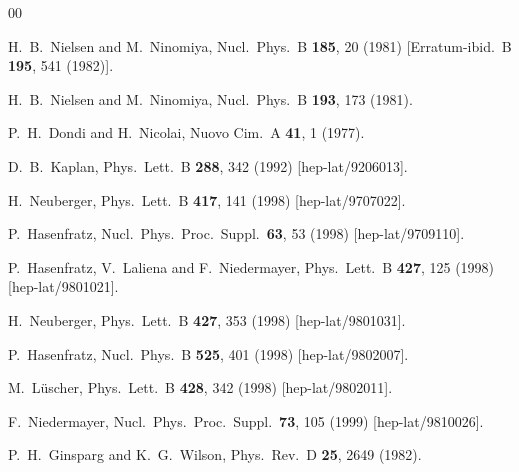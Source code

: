 \begin{thebibliography}{00}

  H.~B.~Nielsen and M.~Ninomiya,
  Nucl.\ Phys.\ B {\bf 185}, 20 (1981)
  [Erratum-ibid.\ B {\bf 195}, 541 (1982)].

  H.~B.~Nielsen and M.~Ninomiya,
  Nucl.\ Phys.\ B {\bf 193}, 173 (1981).

  P.~H.~Dondi and H.~Nicolai,
  Nuovo Cim.\ A {\bf 41}, 1 (1977).

  D.~B.~Kaplan,
  Phys.\ Lett.\ B {\bf 288}, 342 (1992)
  [hep-lat/9206013].

  H.~Neuberger,
  Phys.\ Lett.\ B {\bf 417}, 141 (1998)
  [hep-lat/9707022].

  P.~Hasenfratz,
  Nucl.\ Phys.\ Proc.\ Suppl.\  {\bf 63}, 53 (1998)
  [hep-lat/9709110].

  P.~Hasenfratz, V.~Laliena and F.~Niedermayer,
  Phys.\ Lett.\ B {\bf 427}, 125 (1998)
  [hep-lat/9801021].

  H.~Neuberger,
  Phys.\ Lett.\ B {\bf 427}, 353 (1998)
  [hep-lat/9801031].

  P.~Hasenfratz,
  Nucl.\ Phys.\ B {\bf 525}, 401 (1998)
  [hep-lat/9802007].

  M.~L\"uscher,
  Phys.\ Lett.\ B {\bf 428}, 342 (1998)
  [hep-lat/9802011].

  F.~Niedermayer,
  Nucl.\ Phys.\ Proc.\ Suppl.\  {\bf 73}, 105 (1999)
  [hep-lat/9810026].

  P.~H.~Ginsparg and K.~G.~Wilson,
  Phys.\ Rev.\ D {\bf 25}, 2649 (1982).


\end{thebibliography}
